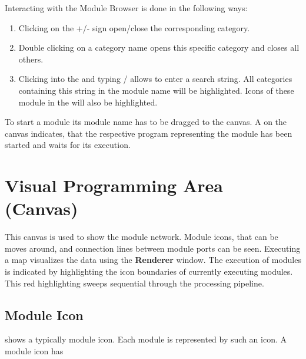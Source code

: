     
    Interacting with the Module Browser is done in the following ways:
    
	 \begin{enumerate}
	 \item Clicking on the +/- sign open/close the corresponding category.
    \item Double clicking on a category name opens this specific category and closes all others.
    \item Clicking into the {\mycanvas} and typing / allows to enter a search string. All categories containing this string in the 
    module name will be highlighted. Icons of these module in the {\mycanvas} will also be highlighted.
	 \end{enumerate}
    
    
	 To start a module its module name has to be dragged to the canvas.  A {\myicon} on the canvas indicates, that the respective 
	 program representing the module has been started and waits for its execution. 


\clearpage
    
    
	 \section{Visual Programming Area (Canvas)}
	 \label{canvas}

	 This canvas is used to show the module network. Module icons,
	 that can be moves around, and connection lines between module ports can be seen. 
	 Executing a map visualizes the data using the {\bf Renderer} window. The execution of modules is indicated by 
	 highlighting the icon boundaries of currently executing modules. This red 
	 highlighting sweeps sequential through the processing pipeline.
    



	 \subsection{Module Icon}
	 \label{icon}



	  shows a typically module icon. 
	 Each module is represented by such an icon. A module icon has 

